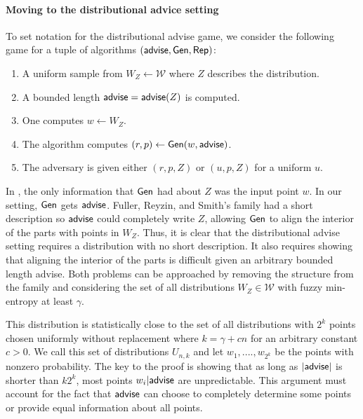 \paragraph{Moving to the distributional advice setting}
To set notation for the distributional advise game, we consider the following game for a tuple of algorithms $({\mathsf{advise}}, {\mathsf{Gen}}, {\mathsf{Rep}})$:
\begin{enumerate}
\itemsep0em
\item A uniform sample from $W_Z \leftarrow \mathcal{W}$ where $Z$ describes the distribution. 
\item A bounded length ${\mathsf{advise}} = {\mathsf{advise}}(Z)$ is computed.
\item One computes $w\leftarrow W_Z$.
\item The algorithm computes $(r, p)\leftarrow {\ensuremath{\mathsf{Gen}}}(w, {\mathsf{advise}})$.
\item The adversary is given either $(r, p, Z)$ or $(u, p, Z)$ for a uniform $u$. 
\end{enumerate}

In \cite{fuller2020fuzzy}, the only information that ${\mathsf{Gen}}$ had about $Z$ was the input point $w$.  In our setting, ${\mathsf{Gen}}$ gets ${\mathsf{advise}}$.  Fuller, Reyzin, and Smith's family had a short description so ${\mathsf{advise}}$ could completely write $Z$, allowing ${\mathsf{Gen}}$ to align the interior of the parts with points in $W_Z$.  Thus, it is clear that the distributional advise  setting requires a distribution with no short description.  It also requires showing that aligning the interior of the parts is difficult given an arbitrary bounded length advise.  Both problems can be approached by removing the structure from the family and considering the set of all distributions $W_Z\in\mathcal{W}$ with fuzzy min-entropy at least $\gamma$. 

This distribution is statistically close to the set of all distributions with $2^k$ points chosen uniformly without replacement where $k = \gamma +cn$ for an arbitrary constant $c>0$.   We call this set of distributions $U_{n,k}$ and let $w_1,...., w_{2^k}$ be the points with nonzero probability.  The key to the proof is showing that as long as $|{\mathsf{advise}}|$ is shorter than $k2^k$, most points $w_i | {\mathsf{advise}}$ are unpredictable.  This argument must account for the fact that ${\mathsf{advise}}$ can choose to completely determine some points or provide equal information about all points. 

